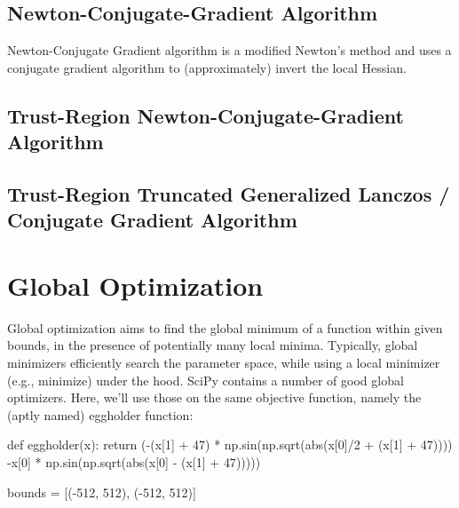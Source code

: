 \documentclass[
  letterpaper,
  DIV=11,
  numbers=noendperiod]{scrreprt}
\newenvironment{Shaded}{\begin{snugshade}}{\end{snugshade}}
\newcommand{\BuiltInTok}[1]{\textcolor[rgb]{0.00,0.23,0.31}{#1}}
\newcommand{\ControlFlowTok}[1]{\textcolor[rgb]{0.00,0.23,0.31}{#1}}
\newcommand{\DecValTok}[1]{\textcolor[rgb]{0.68,0.00,0.00}{#1}}
\newcommand{\KeywordTok}[1]{\textcolor[rgb]{0.00,0.23,0.31}{#1}}
\newcommand{\NormalTok}[1]{\textcolor[rgb]{0.00,0.23,0.31}{#1}}
\newcommand{\OperatorTok}[1]{\textcolor[rgb]{0.37,0.37,0.37}{#1}}
\begin{document}
\subsection{Newton-Conjugate-Gradient Algorithm}\label{sec-newton-cg}

Newton-Conjugate Gradient algorithm is a modified Newton's method and
uses a conjugate gradient algorithm to (approximately) invert the local
Hessian.

\subsection{Trust-Region Newton-Conjugate-Gradient
Algorithm}\label{sec-trust-region-newton}

\subsection{Trust-Region Truncated Generalized Lanczos / Conjugate
Gradient Algorithm}\label{sec-trust-region-truncated}

\section{Global Optimization}\label{global-optimization}

Global optimization aims to find the global minimum of a function within
given bounds, in the presence of potentially many local minima.
Typically, global minimizers efficiently search the parameter space,
while using a local minimizer (e.g., minimize) under the hood. SciPy
contains a number of good global optimizers. Here, we'll use those on
the same objective function, namely the (aptly named) eggholder
function:

\begin{Shaded}
\begin{Highlighting}[]
\KeywordTok{def}\NormalTok{ eggholder(x):}
    \ControlFlowTok{return}\NormalTok{ (}\OperatorTok{{-}}\NormalTok{(x[}\DecValTok{1}\NormalTok{] }\OperatorTok{+} \DecValTok{47}\NormalTok{) }\OperatorTok{*}\NormalTok{ np.sin(np.sqrt(}\BuiltInTok{abs}\NormalTok{(x[}\DecValTok{0}\NormalTok{]}\OperatorTok{/}\DecValTok{2} \OperatorTok{+}\NormalTok{ (x[}\DecValTok{1}\NormalTok{]  }\OperatorTok{+} \DecValTok{47}\NormalTok{))))}
            \OperatorTok{{-}}\NormalTok{x[}\DecValTok{0}\NormalTok{] }\OperatorTok{*}\NormalTok{ np.sin(np.sqrt(}\BuiltInTok{abs}\NormalTok{(x[}\DecValTok{0}\NormalTok{] }\OperatorTok{{-}}\NormalTok{ (x[}\DecValTok{1}\NormalTok{]  }\OperatorTok{+} \DecValTok{47}\NormalTok{)))))}

\NormalTok{bounds }\OperatorTok{=}\NormalTok{ [(}\OperatorTok{{-}}\DecValTok{512}\NormalTok{, }\DecValTok{512}\NormalTok{), (}\OperatorTok{{-}}\DecValTok{512}\NormalTok{, }\DecValTok{512}\NormalTok{)]}
\end{Highlighting}
\end{Shaded}
\end{document}
